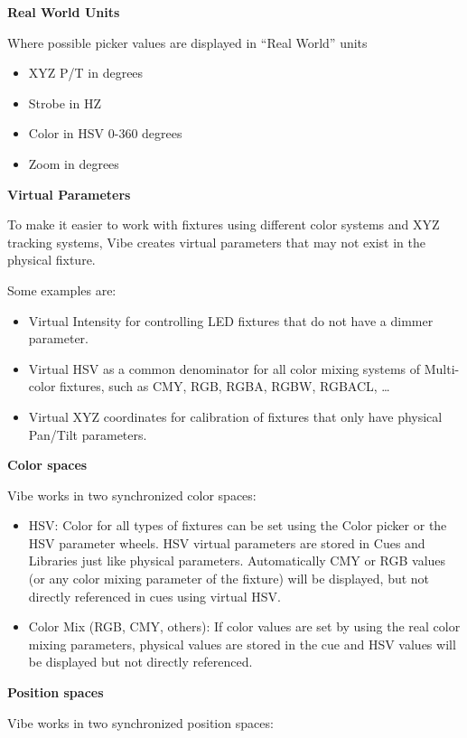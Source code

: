 \documentclass[
]{article}
\begin{document}
\textbf{Real World Units}

Where possible picker values are displayed in ``Real World'' units

\begin{itemize}
\item
  XYZ P/T in degrees
\item
  Strobe in HZ
\item
  Color in HSV 0-360 degrees
\item
  Zoom in degrees
\end{itemize}

\textbf{Virtual Parameters}

To make it easier to work with fixtures using different color systems and XYZ tracking systems, Vibe creates virtual parameters that may not exist in the physical fixture.

Some examples are:

\begin{itemize}
\item
  Virtual Intensity for controlling LED fixtures that do not have a dimmer parameter.
\item
  Virtual HSV as a common denominator for all color mixing systems of Multi-color fixtures, such as CMY, RGB, RGBA, RGBW, RGBACL, \ldots{}
\item
  Virtual XYZ coordinates for calibration of fixtures that only have physical Pan/Tilt parameters.
\end{itemize}

\textbf{Color spaces}

Vibe works in two synchronized color spaces:

\begin{itemize}
\item
  HSV: Color for all types of fixtures can be set using the Color picker or the HSV parameter wheels. HSV virtual parameters are stored in Cues and Libraries just like physical parameters. Automatically CMY or RGB values (or any color mixing parameter of the fixture) will be displayed, but not directly referenced in cues using virtual HSV.
\item
  Color Mix (RGB, CMY, others): If color values are set by using the real color mixing parameters, physical values are stored in the cue and HSV values will be displayed but not directly referenced.
\end{itemize}

\textbf{Position spaces}

Vibe works in two synchronized position spaces:
\end{document}
